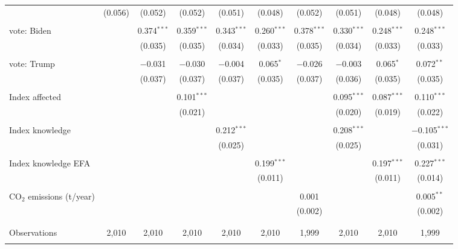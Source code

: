 \begin{tabular}{@{\extracolsep{5pt}}lccccccccc}
  & (0.056) & (0.052) & (0.052) & (0.051) & (0.048) & (0.052) & (0.051) & (0.048) & (0.048) \\ 
  & & & & & & & & & \\ 
 vote: Biden &  & 0.374$^{***}$ & 0.359$^{***}$ & 0.343$^{***}$ & 0.260$^{***}$ & 0.378$^{***}$ & 0.330$^{***}$ & 0.248$^{***}$ & 0.248$^{***}$ \\ 
  &  & (0.035) & (0.035) & (0.034) & (0.033) & (0.035) & (0.034) & (0.033) & (0.033) \\ 
  & & & & & & & & & \\ 
 vote: Trump &  & $-$0.031 & $-$0.030 & $-$0.004 & 0.065$^{*}$ & $-$0.026 & $-$0.003 & 0.065$^{*}$ & 0.072$^{**}$ \\ 
  &  & (0.037) & (0.037) & (0.037) & (0.035) & (0.037) & (0.036) & (0.035) & (0.035) \\ 
  & & & & & & & & & \\ 
 Index affected &  &  & 0.101$^{***}$ &  &  &  & 0.095$^{***}$ & 0.087$^{***}$ & 0.110$^{***}$ \\ 
  &  &  & (0.021) &  &  &  & (0.020) & (0.019) & (0.022) \\ 
  & & & & & & & & & \\ 
 Index knowledge &  &  &  & 0.212$^{***}$ &  &  & 0.208$^{***}$ &  & $-$0.105$^{***}$ \\ 
  &  &  &  & (0.025) &  &  & (0.025) &  & (0.031) \\ 
  & & & & & & & & & \\ 
 Index knowledge EFA &  &  &  &  & 0.199$^{***}$ &  &  & 0.197$^{***}$ & 0.227$^{***}$ \\ 
  &  &  &  &  & (0.011) &  &  & (0.011) & (0.014) \\ 
  & & & & & & & & & \\ 
 CO$_{2}$ emissions (t/year) &  &  &  &  &  & 0.001 &  &  & 0.005$^{**}$ \\ 
  &  &  &  &  &  & (0.002) &  &  & (0.002) \\ 
  & & & & & & & & & \\ 
\hline \\[-1.8ex] 

Observations & 2,010 & 2,010 & 2,010 & 2,010 & 2,010 & 1,999 & 2,010 & 2,010 & 1,999 \\ 
\hline 
\hline \\[-1.8ex] 
\end{tabular} 